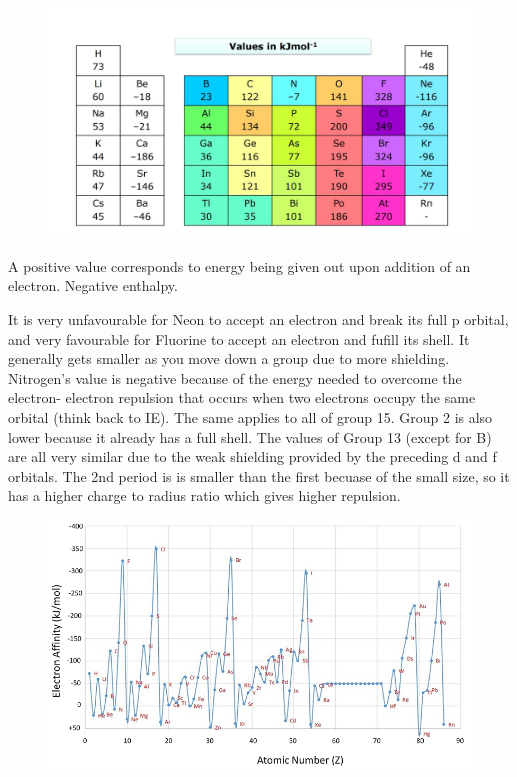 \documentclass{article}
\newcommand{\NB}{{\large\lefthand}\quad}
\begin{document}
    \begin{figure}[h]
        \centering
        \includegraphics[width=12cm]{ea.jpg}
    \end{figure}
    \NB A positive value corresponds to energy being given out upon addition of an electron. Negative enthalpy.

    It is very unfavourable for Neon to accept an electron and break its full p orbital, and very favourable for
    Fluorine to accept an electron and fufill its shell. It generally gets smaller as you move down a group
    due to more shielding. Nitrogen's value is negative because of the energy needed to overcome the electron-
    electron repulsion that occurs when two electrons occupy the same orbital (think back to IE). 
    The same applies to all of group 15. Group 2 is also lower because it already has a full shell.
    The values of Group 13 (except for B) are all very similar due to the weak shielding provided by the 
    preceding d and f orbitals.
    The 2nd period is is smaller than the first becuase of the small size, so it has a higher charge to radius 
    ratio which gives higher repulsion.
    \begin{figure}[h]
        \centering
        \includegraphics[width=12cm]{ea2.png}
    \end{figure}
    \newpage
\end{document}
